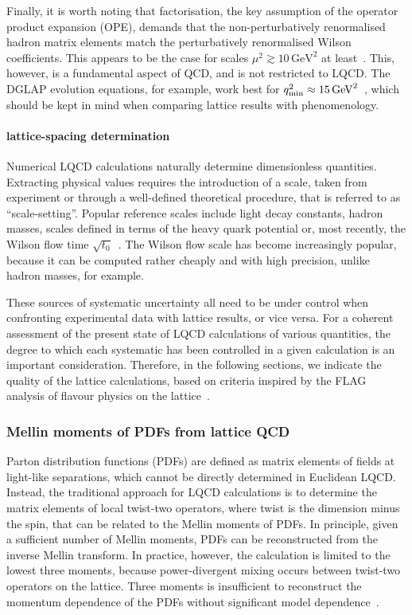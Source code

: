 Finally, it is worth noting that factorisation, the key assumption of the operator product expansion (OPE), demands that the non-perturbatively renormalised hadron matrix elements match the perturbatively renormalised Wilson coefficients. This appears to be the case for scales $\mu^2 \gtrsim 10 \, \mbox{GeV}^2$ at least~\cite{Gockeler:2010yr}. This, however, is a fundamental aspect of QCD, and is not restricted to LQCD. The DGLAP evolution equations, for example, work best for $q^2_{\rm min} \approx 15 \, \mbox{GeV}^2$~\cite{Abramowicz:2015mha}, which should be kept in mind when comparing lattice results with phenomenology.

\paragraph{lattice-spacing determination} Numerical LQCD calculations naturally determine dimensionless quantities. Extracting physical values requires the introduction of a scale, taken from experiment or through a well-defined theoretical procedure, that is referred to as ``scale-setting''. Popular reference scales include light decay constants, hadron masses, scales defined in terms of the heavy quark potential or, most recently, the Wilson flow time $\sqrt{t_0}$~\cite{Luscher:2010iy}. The Wilson flow scale has become increasingly popular, because it can be computed rather cheaply and with high precision, unlike hadron masses, for example.

These sources of systematic uncertainty all need to be under control when confronting experimental data with lattice results, or vice versa. For a coherent assessment of the present state of LQCD calculations of various quantities, the degree to which each systematic has been controlled in a given calculation is an important consideration. Therefore, in the following sections, we indicate the quality of the lattice calculations, based on criteria inspired by the FLAG analysis of flavour physics on the lattice~\cite{Aoki:2016frl}.

\subsubsection{Mellin moments of PDFs from lattice QCD}
\label{Sec:MomentsLQCD}
Parton distribution functions (PDFs) are defined as matrix elements of fields at light-like separations, which cannot be directly determined in Euclidean LQCD. Instead, the traditional approach for LQCD calculations is to determine the matrix elements of local twist-two operators, where twist is the dimension minus the spin, that can be related to the Mellin moments of PDFs. In principle, given a sufficient number of Mellin moments, PDFs can be reconstructed from the inverse Mellin transform. In practice, however, the calculation is limited to the lowest three moments, because power-divergent mixing occurs between twist-two operators on the lattice. Three moments is insufficient to reconstruct the momentum dependence of the PDFs without significant model dependence~\cite{Detmold:2003rq}.


